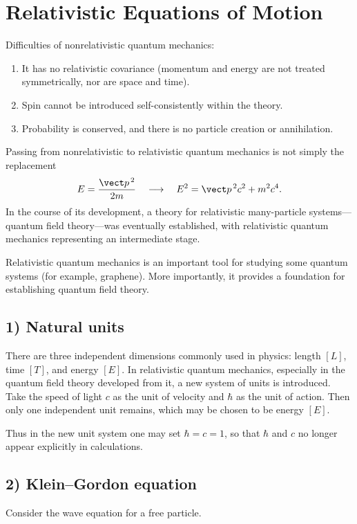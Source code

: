 \section{Relativistic Equations of Motion}
Difficulties of nonrelativistic quantum mechanics:
\begin{enumerate}[label=\arabic*)]
\item It has no relativistic covariance (momentum and energy are not treated symmetrically, nor are space and time).
\item Spin cannot be introduced self-consistently within the theory.
\item Probability is conserved, and there is no particle creation or annihilation.
\end{enumerate}
Passing from nonrelativistic to relativistic quantum mechanics is not simply the replacement
\[
E=\frac{\vect p^{\,2}}{2m}\quad\longrightarrow\quad E^2=\vect p^{\,2}c^2+m^2c^4.
\]
In the course of its development, a theory for relativistic many-particle systems---quantum field theory---was eventually established, with relativistic quantum mechanics representing an intermediate stage.

Relativistic quantum mechanics is an important tool for studying some quantum systems (for example, graphene). More importantly, it provides a foundation for establishing quantum field theory.

\subsection*{1) Natural units}
There are three independent dimensions commonly used in physics: length $[L]$, time $[T]$, and energy $[E]$. In relativistic quantum mechanics, especially in the quantum field theory developed from it, a new system of units is introduced. Take the speed of light $c$ as the unit of velocity and $\hbar$ as the unit of action. Then only one independent unit remains, which may be chosen to be energy $[E]$.

Thus in the new unit system one may set $\hbar=c=1$, so that $\hbar$ and $c$ no longer appear explicitly in calculations.

\subsection*{2) Klein--Gordon equation}
Consider the wave equation for a free particle.

